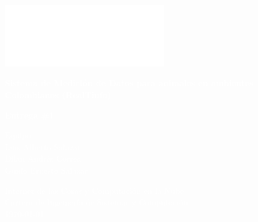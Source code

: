
\pagecolor{UoDDarkBlue}\afterpage{\nopagecolor}

\includegraphics[width=7cm]{images/pujc-logo.png}
\vspace*{3cm}

\fontsize{40}{45}\selectfont \textcolor{white}{\textbf{Sistema de Medición de Datos para animales en ambientes Colombianos (RealTinfo)}}

\vspace{10mm}
\Large{\textcolor{white}{\textbf{Entrega \#1}}}

\vspace{30mm}

\begin{flushright}
\textcolor{white}
{Equipo: \\
Luis Alberto Salazar \\
Dilan Andrés Correa \\
Guido Ernesto Salazar}
\end{flushright}

\vspace{30mm}

\begin{center}
\textcolor{white}
{
Internet de las Cosas y Computación en la Nube \\
Carrera de Ingeniería de Sistemas y Computación \\
\today
}
\end{center}

\thispagestyle{empty}

\restoregeometry   
\newpage
